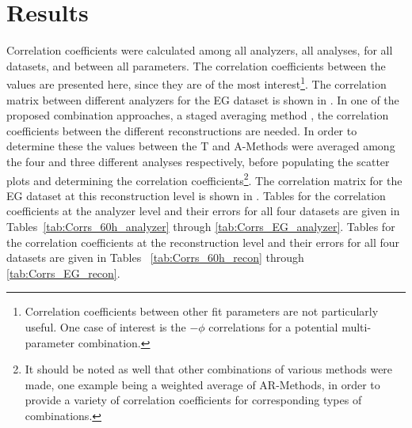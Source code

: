 
\graphicspath{{Body/Figures/Correlations/}}

\clearpage
\section{Results}


Correlation coefficients were calculated among all analyzers, all analyses, for all datasets, and between all parameters. The correlation coefficients between the \R values are presented here, since they are of the most interest\footnote{Correlation coefficients between other fit parameters are not particularly useful. One case of interest is the \R$-\phi$ correlations for a potential multi-parameter combination.}. The correlation matrix between different analyzers for the EG dataset is shown in . In one of the proposed combination approaches, a staged averaging method \cite{CombinationMeeting,DavidCollabTalk}, the correlation coefficients between the different reconstructions are needed. In order to determine these the \R values between the \RW T and A-Methods were averaged among the four and three different analyses respectively, before populating the scatter plots and determining the correlation coefficients\footnote{It should be noted as well that other combinations of various methods were made, one example being a weighted average of \RW AR-Methods, in order to provide a variety of correlation coefficients for corresponding types of combinations.}. The correlation matrix for the EG dataset at this reconstruction level is shown in . Tables for the correlation coefficients at the analyzer level and their errors for all four datasets are given in Tables~\ref{tab:Corrs_60h_analyzer} through \ref{tab:Corrs_EG_analyzer}. Tables for the correlation coefficients at the reconstruction level and their errors for all four datasets are given in Tables ~\ref{tab:Corrs_60h_recon} through \ref{tab:Corrs_EG_recon}.



